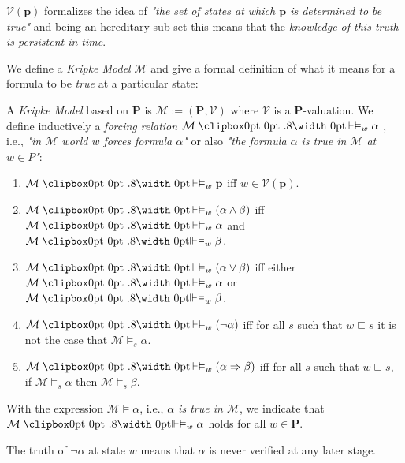 	\begin{remark}
		$\mathcal{V}(\textbf{p})$ formalizes the idea of \emph{"the set of states at which $\textbf{p}$ is determined to be true"} and being an hereditary sub-set this means that the \emph{knowledge of this truth is persistent in time}.
	\end{remark}
	
	We define a \emph{Kripke Model} $\mathcal{M}$ and give a formal definition of what it means for a formula to be \emph{true} at a particular state:
	
	\begin{definition}
		A \emph{Kripke Model} based on \textbf{P} is $\mathcal{M} := (\textbf{P}, \mathcal{V})$ where $\mathcal{V}$ is a \textbf{P}-valuation. \newline
		We define inductively a \emph{forcing relation} $\mathcal{M} \VDashA_w \alpha$ \newline, i.e., \emph{"in $\mathcal{M}$ world $w$ forces formula $\alpha$"} or also \emph{"the formula $\alpha$ is true in $\mathcal{M}$ at  $w \in P$"}:
		\begin{enumerate}
			\item $\mathcal{M} \VDashA_w \textbf{p}$ iff $w \in \mathcal{V}(\textbf{p})$.
			\item $\mathcal{M} \VDashA_w (\alpha \land \beta)$ iff $\mathcal{M} \VDashA_w \alpha$ and $\mathcal{M} \VDashA_w \beta$.
			\item $\mathcal{M} \VDashA_w (\alpha \lor \beta)$ iff either $\mathcal{M} \VDashA_w \alpha$ or $\mathcal{M} \VDashA_w \beta$.
			\item $\mathcal{M} \VDashA_w (\neg\alpha)$ iff for all $s$ such that $w \sqsubseteq s$ it is not the case that $\mathcal{M} \vDash_s \alpha$.
			\item $\mathcal{M} \VDashA_w (\alpha \Rightarrow \beta)$ iff for all $s$ such that $w \sqsubseteq s$, if $\mathcal{M} \vDash_s \alpha$ then $\mathcal{M} \vDash_s \beta$.
		\end{enumerate}
		With the expression $\mathcal{M} \vDash \alpha$, i.e., \emph{$\alpha$ is true in $\mathcal{M}$}, we indicate that $\mathcal{M} \VDashA_w \alpha$ holds for all $w \in \textbf{P}$.
	\end{definition}
	
	\begin{remark}
		The truth of $\neg \alpha$ at state $w$ means that $\alpha$ is never verified at any later stage.
	\end{remark}
	
